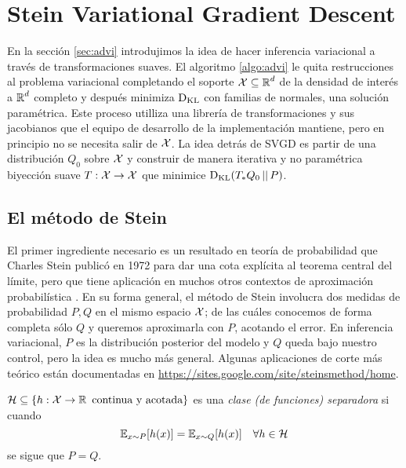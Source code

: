 \documentclass[main.tex]{subfiles}
\begin{document}
\chapter{Stein Variational Gradient Descent}
En la sección \ref{sec:advi} introdujimos la idea de hacer inferencia variacional a través de transformaciones suaves. El algoritmo \eqref{algo:advi} le quita restrucciones al problema variacional completando el soporte $\operatorname{\mathcal{X}}\subseteq\operatorname{\mathbb{R}}^d$ de la densidad de interés a $\operatorname{\mathbb{R}}^d$ completo y después minimiza $\operatorname*{D_{KL}}$ con familias de normales, una solución paramétrica. Este proceso utilliza una librería de transformaciones y sus jacobianos que el equipo de desarrollo de la implementación mantiene\cite{advi}, pero en principio no se necesita salir de $\operatorname{\mathcal{X}}$. La idea detrás de SVGD es partir de una distribución $Q_0$ sobre $\operatorname{\mathcal{X}}$ y construir de manera iterativa y no paramétrica biyección suave $T: \operatorname{\mathcal{X}} \to \operatorname{\mathcal{X}}$ que minimice $\operatorname*{D_{KL}}(T_*Q_0\operatorname*{\mid\mid} P)$.

\section{El método de Stein}

El primer ingrediente necesario es un resultado en teoría de probabilidad que Charles Stein publicó en 1972 para dar una cota explícita al teorema central del límite, pero que tiene aplicación en muchos otros contextos de aproximación probabilística \cite{stein-magic-method, formal-stein-method}. En su forma general, el método de Stein involucra dos medidas de probabilidad $P, Q$ en el mismo espacio $\operatorname{\mathcal{X}}$; de las cuáles conocemos de forma completa sólo $Q$ y queremos aproximarla con $P$, acotando el error. En inferencia variacional, $P$ es la distribución posterior del modelo y $Q$ queda bajo nuestro control, pero la idea es mucho más general. Algunas aplicaciones de corte más teórico están documentadas en \url{https://sites.google.com/site/steinsmethod/home}. 

\begin{definition}
    $ \mathcal{H} \subseteq \{h: \operatorname{\mathcal{X}} \to \operatorname{\mathbb{{R}}} \textrm{ continua y acotada}\}$ es una \textit{clase (de funciones) separadora} si cuando 
    \begin{equation*}
        \operatorname{\mathbb{E}}_{x\sim P}[h(x)] = \operatorname{\mathbb{E}}_{x\sim Q}[h(x)] \quad \forall h \in \mathcal{H} 
    \end{equation*}
    se sigue que $P=Q$.
\end{definition}
\end{document}
